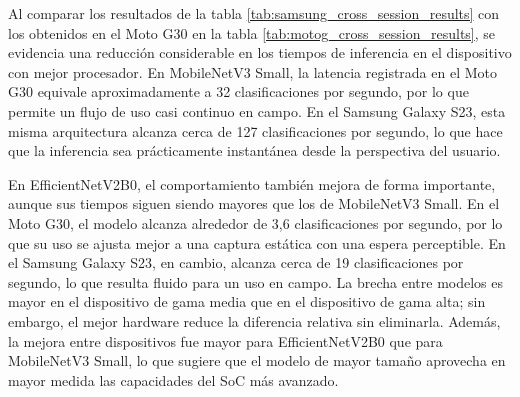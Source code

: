 \begin{table}[H]
    \centering
    \caption{Promedio entre sesiones de las métricas de ejecución en Samsung Galaxy S23.}
    \label{tab:samsung_cross_session_results}
\end{table}

Al comparar los resultados de la tabla \ref{tab:samsung_cross_session_results} con los obtenidos en el Moto G30 en la tabla
\ref{tab:motog_cross_session_results}, se evidencia una reducción considerable en los tiempos de inferencia en el dispositivo con
mejor procesador. En MobileNetV3 Small, la latencia registrada en el Moto G30 equivale aproximadamente a 32 clasificaciones por
segundo, por lo que permite un flujo de uso casi continuo en campo. En el Samsung Galaxy S23, esta misma arquitectura alcanza cerca
de 127 clasificaciones por segundo, lo que hace que la inferencia sea prácticamente instantánea desde la perspectiva del usuario.

En EfficientNetV2B0, el comportamiento también mejora de forma importante, aunque sus tiempos siguen siendo mayores que los de
MobileNetV3 Small. En el Moto G30, el modelo alcanza alrededor de 3,6 clasificaciones por segundo, por lo que su uso se ajusta mejor
a una captura estática con una espera perceptible. En el Samsung Galaxy S23, en cambio, alcanza cerca de 19 clasificaciones por
segundo, lo que resulta fluido para un uso en campo. La brecha entre modelos es mayor en el dispositivo de gama media que en el
dispositivo de gama alta; sin embargo, el mejor hardware reduce la diferencia relativa sin eliminarla. Además, la mejora entre
dispositivos fue mayor para EfficientNetV2B0 que para MobileNetV3 Small, lo que sugiere que el modelo de mayor tamaño aprovecha en
mayor medida las capacidades del SoC más avanzado.

